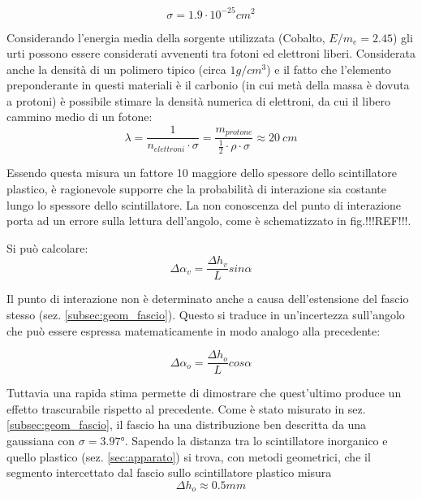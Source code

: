 \documentclass[8pt]{extarticle}
\begin{document}
\begin{equation}
\sigma = 1.9 \cdot 10^{-25} cm^2
\nonumber
\end{equation}

Considerando l'energia media della sorgente utilizzata (Cobalto, $E/m_e = 2.45$) gli urti possono essere considerati avvenenti tra fotoni ed elettroni liberi. Considerata anche la densità di un polimero tipico (circa $1 g/cm^3$) e il fatto che l'elemento preponderante in questi materiali è il carbonio (in cui metà della massa è dovuta a protoni) è possibile stimare la densità numerica di elettroni, da cui il libero cammino medio di un fotone: \\
 
\begin{equation}
\lambda = \frac{1}{n_{elettroni} \cdot \sigma} = \frac{m_{protone}}{\frac{1}{2} \cdot \rho \cdot \sigma} \approx 20 \ cm
\nonumber
\end{equation}

Essendo questa misura un fattore 10 maggiore dello spessore dello scintillatore plastico, è ragionevole supporre che la probabilità di interazione sia costante lungo lo spessore dello scintillatore. La non conoscenza del punto di interazione porta ad un errore sulla lettura dell'angolo, come è schematizzato in fig.!!!REF!!!. 


Si può calcolare:
\begin{equation}
\Delta \alpha_v = \frac{\Delta h_v}{L} sin\alpha
\nonumber
\end{equation}

Il punto di interazione non è determinato anche a causa dell'estensione del fascio stesso (sez. \ref{subsec:geom_fascio}). Questo si traduce in un'incertezza sull'angolo che può essere espressa matematicamente in modo analogo alla precedente:

\begin{equation}
\Delta \alpha_o = \frac{\Delta h_o}{L} cos\alpha
\nonumber
\end{equation}

Tuttavia una rapida stima permette di dimostrare che quest'ultimo produce un effetto trascurabile rispetto al precedente. Come è stato misurato in sez. \ref{subsec:geom_fascio}, il fascio ha una distribuzione ben descritta da una gaussiana con $\sigma = 3.97 °$. Sapendo la distanza tra lo scintillatore inorganico e quello plastico (sez. \ref{sec:apparato}) si trova, con metodi geometrici, che il segmento intercettato dal fascio sullo scintillatore plastico misura \\
\begin{equation}
\Delta h_o \approx 0.5 mm
\end{equation}
\end{document}
